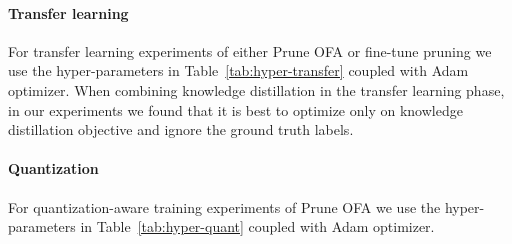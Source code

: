 \documentclass{article}
\begin{document}
\paragraph{Transfer learning}
For transfer learning experiments of either Prune OFA or fine-tune pruning we use the hyper-parameters in Table~\ref{tab:hyper-transfer} coupled with Adam optimizer.
When combining knowledge distillation in the transfer learning phase, in our experiments we found that it is best to optimize only on knowledge distillation objective and ignore the ground truth labels.

\paragraph{Quantization}
For quantization-aware training experiments of Prune OFA  we use the hyper-parameters in Table~\ref{tab:hyper-quant} coupled with Adam optimizer.
\end{document}
